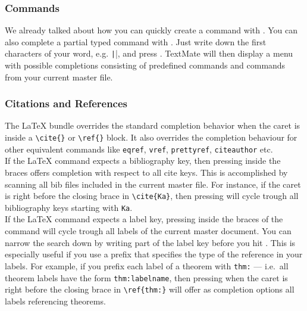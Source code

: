 \documentclass[11pt, x11names]{article}
\begin{document}
\subsubsection{Commands}

We already talked about how you can quickly create a command with . You can also complete a partial typed command with . Just write down the first characters of your word, e.g. \texttt|\table|, and press \keys{\Alt + \esc}. TextMate will then display a menu with possible completions consisting of predefined commands and commands from your current master file.

\subsubsection{Citations and References}

The LaTeX bundle overrides the standard completion behavior when the caret is inside a \texttt{\textbackslash{}cite\{\}} or \texttt{\textbackslash{}ref\{\}} block. It also overrides the completion behaviour for other equivalent commands like \texttt{eqref}, \texttt{vref}, \texttt{prettyref}, \texttt{citeauthor} etc.\\

If the LaTeX command expects a bibliography key, then pressing \keys{\esc} inside the braces offers completion with respect to all cite keys. This is accomplished by scanning all bib files included in the current master file. For instance, if the caret is right before the closing brace in \texttt{\textbackslash{}cite\{Ka\}}, then pressing \keys{\esc} will cycle trough all bibliography keys starting with \texttt{Ka}.\\

If the LaTeX command expects a label key, pressing \keys{\esc} inside the braces of the command will cycle trough all labels of the current master document. You can narrow the search down by writing part of the label key before you hit \keys{\esc}. This is especially useful if you use a prefix that specifies the type of the reference in your labels. For example, if you prefix each label of a theorem with \texttt{thm:} — i.e.~all theorem labels have the form \texttt{thm:labelname}, then pressing \keys{\esc} when the caret is right before the closing brace in \texttt{\textbackslash{}ref\{thm:\}} will offer as completion options all labels referencing theorems.\\
\end{document}
